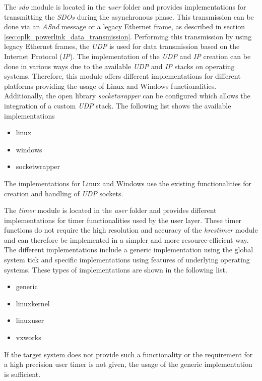 \begin{description}[leftmargin=1cm]
    \item[sdo] The \emph{sdo} module is located in the \emph{user} folder and provides implementations for transmitting the \emph{SDOs} during the asynchronous phase.
    This transmission can be done via an \emph{ASnd} message or a legacy Ethernet frame, as described in section \ref{sec:oplk_powerlink_data_transmission}.
    Performing this transmission by using legacy Ethernet frames, the \emph{UDP} is used for data transmission based on the Internet Protocol (\emph{IP}).
    The implementation of the \emph{UDP} and \emph{IP} creation can be done in various ways due to the available \emph{UDP} and \emph{IP} stacks on operating systems.
    Therefore, this module offers different implementations for different platforms providing the usage of Linux and Windows functionalities.
    Additionally, the open library \emph{socketwrapper} can be configured which allows the integration of a custom \emph{UDP} stack.
    The following list shows the available implementations
    \begin{multicols}{3}
        \begin{itemize}
            \item linux
            \item windows
            \item socketwrapper
        \end{itemize}
    \end{multicols}
    The implementations for Linux and Windows use the existing functionalities for creation and handling of \emph{UDP} sockets.\\
    
    
    \item[timer] The \emph{timer} module is located in the \emph{user} folder and provides different implementations for timer functionalities used by the user layer.
    These timer functions do not require the high resolution and accuracy of the \emph{hrestimer} module and can therefore be implemented in a simpler and more resource-efficient way.
    The different implementations include a generic implementation using the global system tick and specific implementations using features of underlying operating systems.
    These types of implementations are shown in the following list.
    \begin{multicols}{3}
        \begin{itemize}
            \item generic
            \item linuxkernel
            \item linuxuser
            \item vxworks
        \end{itemize}
    \end{multicols}
    If the target system does not provide such a functionality or the requirement for a high precision user timer is not given, the usage of the generic implementation is sufficient.\\
    

\end{description}
